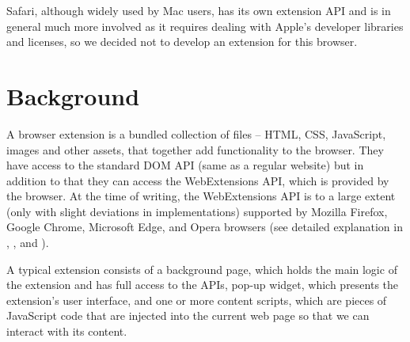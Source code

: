 \documentclass[bsc,frontabs,twoside,singlespacing,parskip,deptreport]{infthesis}
\begin{document}
Safari, although widely used by Mac users, has its own extension API and is in general much more involved as it requires dealing with Apple's developer libraries and licenses, so we decided not to develop an extension for this browser.






\chapter{Background}
A browser extension is a bundled collection of files -- HTML, CSS, JavaScript, images and other assets, that together add functionality to the browser. They have access to the standard DOM API (same as a regular website) but in addition to that they can access the WebExtensions API, which is provided by the browser. At the time of writing, the WebExtensions API is to a large extent (only with slight deviations in implementations) supported by Mozilla Firefox, Google Chrome, Microsoft Edge, and Opera browsers (see detailed explanation in \cite{C1}, \cite{C2}, \cite{M6} and \cite{M7}).

A typical extension consists of a background page, which holds the main logic of the extension and has full access to the APIs, pop-up widget, which presents the extension's user interface, and one or more content scripts, which are pieces of JavaScript code that are injected into the current web page so that we can interact with its content.
\end{document}
